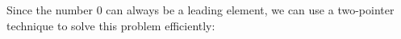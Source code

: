 \documentclass[preview]{standalone}
\begin{document}
Since the number 0 can always be a leading element, we can use a two-pointer technique to solve this problem efficiently:\\
\end{document}
